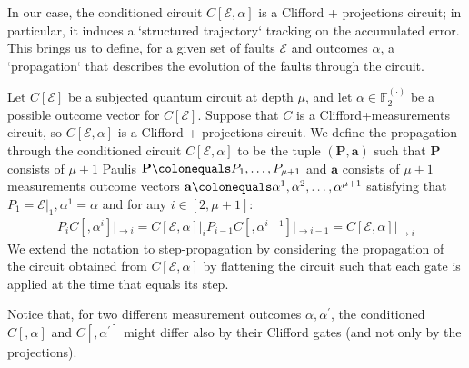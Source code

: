 In our case, the conditioned circuit $C[\mathcal{E}, \alpha]$ is a Clifford + projections circuit; in particular, it induces a `structured trajectory` tracking on the accumulated error. This brings us to define, for a given set of faults $\mathcal{E}$ and outcomes $\alpha$, a `propagation` that describes the evolution of the faults through the circuit.
\begin{definition}[Propagation]
  \label{def:propagation}
Let $C[\mathcal{E}]$ be a subjected quantum circuit at depth $\mu$, and let $\alpha \in \mathbb{F}_{2}^{(\cdot)}$ be a possible outcome vector for $C[\mathcal{E}]$. Suppose that $C$ is a Clifford+measurements circuit, so $C[\mathcal{E},\alpha]$ is a Clifford + projections circuit. We define the propagation through the conditioned circuit $C[\mathcal{E},\alpha]$ to be the tuple $(\mathbf{P},\mathbf{a})$ such that $\mathbf{P}$ consists of $\mu+1$ Paulis $\mathbf{P} \colonequals P_{1}, \ldots, P_{\mu+1}$ and $\mathbf{a}$ consists of $\mu+1$ measurements outcome vectors $\mathbf{a} \colonequals \alpha^{1}, \alpha^{2}, \ldots, \alpha^{\mu+1}$ satisfying that $P_{1} = \mathcal{E}|_{1}, \alpha^{1}=\alpha$ and for any $i \in [2, \mu+1]$:
  \begin{equation*}
    \begin{split}
      P_{i}C[,\alpha^{i}]|_{\rightarrow i} =  C[\mathcal{E},\alpha]|_{ i} P_{i-1} C[,\alpha^{i-1}]|_{\rightarrow i-1} = C[\mathcal{E},\alpha]|_{\rightarrow i}
    \end{split}
  \end{equation*}
We extend the notation to step-propagation by considering the propagation of the circuit obtained from $C[\mathcal{E},\alpha]$ by flattening the circuit such that each gate is applied at the time that equals its step. 
\end{definition}

\begin{remark}
Notice that, for two different measurement outcomes $\alpha,\alpha^{\prime}$, the conditioned $C[,\alpha]$ and $C[,\alpha^{\prime}]$ might differ also by their Clifford gates (and not only by the projections).
\end{remark}



